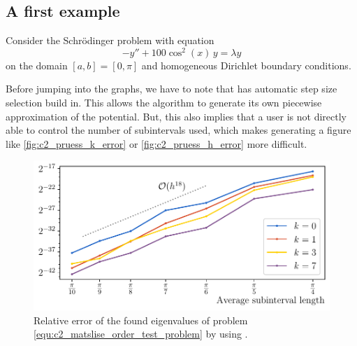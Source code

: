 \subsection{A first example}

Consider the Schrödinger problem with equation
\begin{equation}\label{equ:c2_matslise_order_test_problem}
    -y'' + 100\cos^2(x)\,y = \lambda y
\end{equation}
on the domain $[a, b] = [0, \pi]$ and homogeneous Dirichlet boundary conditions.

Before jumping into the graphs, we have to note that  has automatic step size selection build in. This allows the algorithm to generate its own piecewise approximation of the potential. But, this also implies that a user is not directly able to control the number of subintervals used, which makes generating a figure like \ref{fig:c2_pruess_k_error} or \ref{fig:c2_pruess_h_error} more difficult.

\begin{figure}
    \begin{center}
        \includegraphics[width=\textwidth]{img/chapter2/matslise_h_error.pdf}
    \end{center}
    \caption{Relative error of the found eigenvalues of problem \eqref{equ:c2_matslise_order_test_problem} by using .}
    \label{fig:c2_matslise_h_error}
\end{figure}

